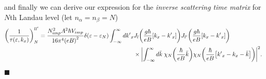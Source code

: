 and finally we can derive our expression for the \textit{inverse
scattering time matrix} for $N$th Landau level (let $n_{\alpha} = n_{\beta} = N$)
\begin{equation} \label{4.65}
  \begin{aligned}
    \qty(\frac{1}{\tau(\varepsilon,k_x)})^{ll'}_{N} =
    \frac { N_{imp}^2 A^2 \hbar V_{imp}}{16\pi^4 \qty(eB)^2}
    \delta(\varepsilon - \varepsilon_{N})
    \int_{-\infty}^{\infty} d {k'}_x
    &
    J_l\qty(\frac{g\hbar}{eB}[{k}_x - {k'}_x])
    J_{l'}\qty(\frac{g\hbar}{eB}[{k}_x - {k'}_x]) \\
    & \times
    \qty|
    \int_{-\infty}^{\infty} d\bar{k} \;
    {\chi}_{N}\qty(\frac{\hbar}{eB}\bar{k})
    {\chi}_{N}\qty(\frac{\hbar}{eB} \qty[{k'}_x - {k}_x - \bar{k}])|^2.
  \end{aligned}
\end{equation}
\hfill$\blacksquare$
